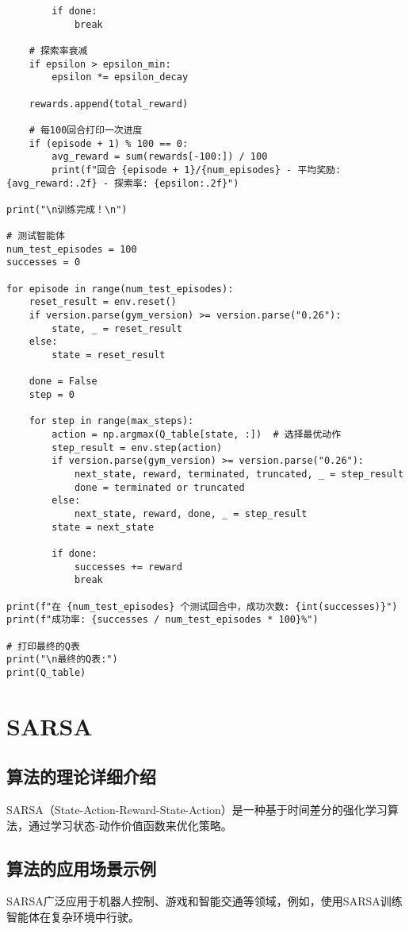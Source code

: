 \begin{lstlisting}
        if done:
            break

    # 探索率衰减
    if epsilon > epsilon_min:
        epsilon *= epsilon_decay

    rewards.append(total_reward)

    # 每100回合打印一次进度
    if (episode + 1) % 100 == 0:
        avg_reward = sum(rewards[-100:]) / 100
        print(f"回合 {episode + 1}/{num_episodes} - 平均奖励: {avg_reward:.2f} - 探索率: {epsilon:.2f}")

print("\n训练完成！\n")

# 测试智能体
num_test_episodes = 100
successes = 0

for episode in range(num_test_episodes):
    reset_result = env.reset()
    if version.parse(gym_version) >= version.parse("0.26"):
        state, _ = reset_result
    else:
        state = reset_result

    done = False
    step = 0

    for step in range(max_steps):
        action = np.argmax(Q_table[state, :])  # 选择最优动作
        step_result = env.step(action)
        if version.parse(gym_version) >= version.parse("0.26"):
            next_state, reward, terminated, truncated, _ = step_result
            done = terminated or truncated
        else:
            next_state, reward, done, _ = step_result
        state = next_state

        if done:
            successes += reward
            break

print(f"在 {num_test_episodes} 个测试回合中，成功次数: {int(successes)}")
print(f"成功率: {successes / num_test_episodes * 100}%")

# 打印最终的Q表
print("\n最终的Q表:")
print(Q_table)

\end{lstlisting}


\section{SARSA}
\subsection*{算法的理论详细介绍}
SARSA（State-Action-Reward-State-Action）是一种基于时间差分的强化学习算法，通过学习状态-动作价值函数来优化策略。

\subsection*{算法的应用场景示例}
SARSA广泛应用于机器人控制、游戏和智能交通等领域，例如，使用SARSA训练智能体在复杂环境中行驶。

